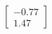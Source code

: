 \documentclass[preview]{standalone}
\begin{document}
\begin{align*}
\begin{bmatrix} -0.77 \\ 1.47 \end{bmatrix}
\end{align*}
\end{document}
